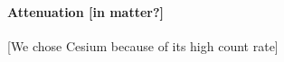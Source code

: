 \begin{figure}[htbp]
\begin{subfigure}{0.495\textwidth}
    \end{subfigure}
    \hfill
    \begin{subfigure}{0.495\textwidth}
    \end{subfigure}
\end{figure}

\paragraph{Attenuation [in matter?]}
[We chose Cesium because of its high count rate]

